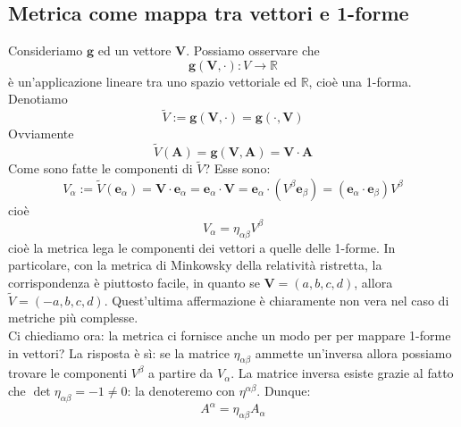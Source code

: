 \documentclass[a4paper,11pt]{book}
\theoremstyle{plain}
\theoremstyle{definition}
\begin{document}
\subsection{Metrica come mappa tra vettori e 1-forme}
Consideriamo $\textbf{g}$ ed un vettore $\textbf{V}$. Possiamo osservare che
\[
\textbf{g}(\textbf{V},\cdot):V\to \mathbb{R}
\]
è un'applicazione lineare tra uno spazio vettoriale ed $\mathbb{R}$, cioè una 1-forma. Denotiamo
\[
\tilde{V} := \textbf{g}(\textbf{V},\cdot) = \textbf{g}(\cdot,\textbf{V})
\]
Ovviamente
\[
\tilde{V}(\textbf{A})=\textbf{g}(\textbf{V},\textbf{A})=\textbf{V}\cdot \textbf{A}
\]
Come sono fatte le componenti di $\tilde{V}$? Esse sono:
\[
V_{\alpha}:=\tilde{V}(\textbf{e}_{\alpha})=\textbf{V}\cdot \textbf{e}_{\alpha}=\textbf{e}_{\alpha}\cdot \textbf{V}=\textbf{e}_{\alpha}\cdot (V^{\beta}\textbf{e}_{\beta})=(\textbf{e}_{\alpha}\cdot \textbf{e}_{\beta})V^{\beta}
\]
cioè
\begin{equation}
V_{\alpha}=\eta_{\alpha\beta}V^{\beta}
\end{equation}
cioè la metrica lega le componenti dei vettori a quelle delle 1-forme. In particolare, con la metrica di Minkowsky della relatività ristretta, la corrispondenza è piuttosto facile, in quanto se $\textbf{V}=(a,b,c,d)$, allora $\tilde{V}=(-a,b,c,d)$. Quest'ultima affermazione è chiaramente non vera nel caso di metriche più complesse. 
\\
Ci chiediamo ora: la metrica ci fornisce anche un modo per per mappare 1-forme in vettori? La risposta è sì: se la matrice $\eta_{\alpha\beta}$ ammette un'inversa allora possiamo trovare le componenti $V^{\beta}$ a partire da $V_{\alpha}$. La matrice inversa esiste grazie al fatto che $\det\eta_{\alpha\beta}=-1\not=0$: la denoteremo con $\eta^{\alpha\beta}$. Dunque:
\begin{equation}
A^{\alpha} = \eta_{\alpha\beta}A_{\alpha}
\end{equation}
\end{document}
